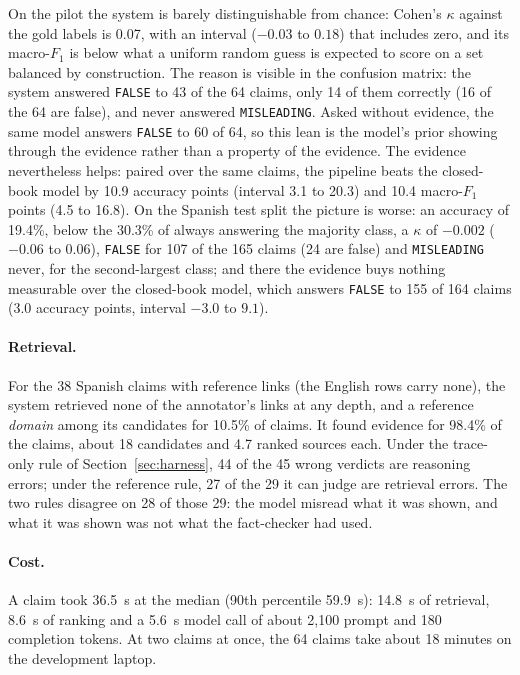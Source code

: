 On the pilot the system is barely distinguishable from chance: Cohen's
$\kappa$ against the gold labels is 0.07, with an interval
($-0.03$ to $0.18$) that includes zero, and its macro-$F_1$ is below
what a uniform random guess is expected to score on a set balanced by
construction. The reason is visible in the confusion matrix: the
system answered \texttt{FALSE} to 43 of the 64 claims, only 14 of them
correctly (16 of the 64 are false), and never answered
\texttt{MISLEADING}. Asked without evidence,
the same model answers \texttt{FALSE} to 60 of 64, so this lean is the
model's prior showing through the evidence rather than a property of
the evidence. The evidence nevertheless helps: paired over the same
claims, the pipeline beats the closed-book model by 10.9 accuracy
points (interval 3.1 to 20.3) and 10.4 macro-$F_1$ points (4.5 to
16.8). On the Spanish test split the picture is worse: an accuracy of 19.4\%, below the 30.3\% of always answering the majority class, a $\kappa$ of $-0.002$ ($-0.06$ to $0.06$), \texttt{FALSE} for 107 of the 165 claims (24 are false) and \texttt{MISLEADING} never, for the second-largest class; and there the evidence buys nothing measurable over the closed-book model, which answers \texttt{FALSE} to 155 of 164 claims (3.0 accuracy points, interval $-3.0$ to $9.1$).

\paragraph{Retrieval.} For the 38 Spanish claims with reference links
(the English rows carry none), the system retrieved none of the
annotator's links at any depth, and a reference \emph{domain} among its
candidates for 10.5\% of claims. It found evidence for 98.4\% of the
claims, about 18 candidates and 4.7 ranked sources each. Under the
trace-only rule of Section~\ref{sec:harness}, 44 of the 45 wrong
verdicts are reasoning errors; under the reference rule, 27 of the 29
it can judge are retrieval errors. The two rules disagree on 28 of
those 29: the model misread what it was shown, and what it was shown
was not what the fact-checker had used.

\paragraph{Cost.} A claim took 36.5~s at the median (90th percentile
59.9~s): 14.8~s of retrieval, 8.6~s of ranking and a 5.6~s model call
of about 2,100 prompt and 180 completion tokens. At two claims at once,
the 64 claims take about 18 minutes on the development laptop.

